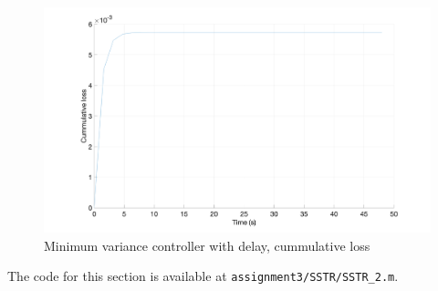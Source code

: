 \begin{figure}
	\centering
	\includegraphics[width=\textwidth]{images/sstr22.png}
	\caption{Minimum variance controller with delay, cummulative loss}
	\label{fig:sstr22}
\end{figure}

\noindent The code for this section is available at \lstinline|assignment3/SSTR/SSTR_2.m|. 

